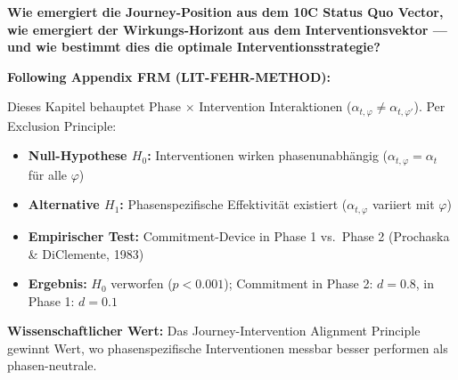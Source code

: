 
\begin{tcolorbox}[colback=red!5!white, colframe=red!75!black,
    title=Central Question]
\textbf{Wie emergiert die Journey-Position aus dem 10C Status Quo Vector, wie emergiert der Wirkungs-Horizont aus dem Interventionsvektor --- und wie bestimmt dies die optimale Interventionsstrategie?}
\end{tcolorbox}

\begin{tcolorbox}[colback=red!5!white, colframe=red!75!black,
    title=\textbf{Methodological Note: The Exclusion Principle (Appendix FRM)}]
\textbf{Following Appendix FRM (LIT-FEHR-METHOD):}

Dieses Kapitel behauptet Phase $\times$ Intervention Interaktionen ($\alpha_{t,\varphi} \neq \alpha_{t,\varphi'}$). Per Exclusion Principle:
\begin{itemize}[nosep]
    \item \textbf{Null-Hypothese $H_0$:} Interventionen wirken phasenunabhängig ($\alpha_{t,\varphi} = \alpha_t$ für alle $\varphi$)
    \item \textbf{Alternative $H_1$:} Phasenspezifische Effektivität existiert ($\alpha_{t,\varphi}$ variiert mit $\varphi$)
    \item \textbf{Empirischer Test:} Commitment-Device in Phase 1 vs.\ Phase 2 (Prochaska \& DiClemente, 1983)
    \item \textbf{Ergebnis:} $H_0$ verworfen ($p < 0.001$); Commitment in Phase 2: $d = 0.8$, in Phase 1: $d = 0.1$
\end{itemize}

\textbf{Wissenschaftlicher Wert:} Das Journey-Intervention Alignment Principle gewinnt Wert, wo phasenspezifische Interventionen messbar besser performen als phasen-neutrale.
\end{tcolorbox}


